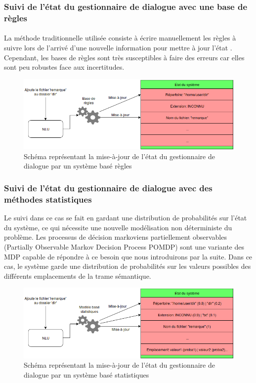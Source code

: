 \subsubsection{Suivi de l'état du gestionnaire de dialogue avec une base de règles}\label{suivi}
\paragraph{}
La méthode traditionnelle utilisée consiste à écrire manuellement les règles à suivre lors de l'arrivé d'une nouvelle information pour mettre à jour l'état \citep{Goddeau1996}. Cependant, les bases de règles sont très susceptibles à faire des erreurs \citep{Chen2017} car elles sont peu robustes face aux incertitudes.


\begin{figure}[H]
	\centering
	\includegraphics[width=.7\linewidth]{images/DM/RuleBasedUpdate.png} 
	\caption{Schéma représentant la mise-à-jour de l'état du gestionnaire de dialogue par un système basé règles} 
\end{figure}

\subsubsection{Suivi de l'état du gestionnaire de dialogue avec des méthodes statistiques}

Le suivi dans ce cas se fait en gardant une distribution de probabilités sur l'état du système, ce qui nécessite une nouvelle modélisation non déterministe du problème. Les processus de décision markoviens partiellement observables (Partially Observable Markov Decision Process POMDP) \citep{Young2010} sont une variante des MDP capable de répondre à ce besoin que nous introduirons par la suite. Dans ce cas, le système garde une distribution de probabilités sur les valeurs possibles des différents emplacements de la trame sémantique.

\begin{figure}[H]
	\centering
	\includegraphics[width=.7\linewidth]{images/DM/StatBasedUpdate.png} 
	\caption{Schéma représentant la mise-à-jour de l'état du gestionnaire de dialogue par un système basé statistiques} 
\end{figure}

